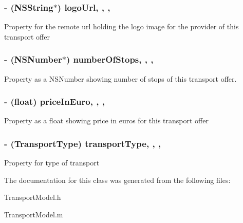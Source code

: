 \subsubsection[{\texorpdfstring{logo\+Url}{logoUrl}}]{\setlength{\rightskip}{0pt plus 5cm}-\/ (N\+S\+String$\ast$) logo\+Url\hspace{0.3cm}{\ttfamily [read]}, {\ttfamily [write]}, {\ttfamily [nonatomic]}, {\ttfamily [retain]}}\hypertarget{interface_transport_model_a2ec564526223b8cfdc249b2ee67d2740}{}\label{interface_transport_model_a2ec564526223b8cfdc249b2ee67d2740}
Property for the remote url holding the logo image for the provider of this transport offer 
\subsubsection[{\texorpdfstring{number\+Of\+Stops}{numberOfStops}}]{\setlength{\rightskip}{0pt plus 5cm}-\/ (N\+S\+Number$\ast$) number\+Of\+Stops\hspace{0.3cm}{\ttfamily [read]}, {\ttfamily [write]}, {\ttfamily [nonatomic]}, {\ttfamily [retain]}}\hypertarget{interface_transport_model_a81a3d5264f0ac295ea5ff98f85f5172a}{}\label{interface_transport_model_a81a3d5264f0ac295ea5ff98f85f5172a}
Property as a N\+S\+Number showing number of stops of this transport offer. 
\subsubsection[{\texorpdfstring{price\+In\+Euro}{priceInEuro}}]{\setlength{\rightskip}{0pt plus 5cm}-\/ (float) price\+In\+Euro\hspace{0.3cm}{\ttfamily [read]}, {\ttfamily [write]}, {\ttfamily [nonatomic]}, {\ttfamily [assign]}}\hypertarget{interface_transport_model_aa756852caf3b4c7fdc98365e3aac39e8}{}\label{interface_transport_model_aa756852caf3b4c7fdc98365e3aac39e8}
Property as a float showing price in euros for this transport offer 
\subsubsection[{\texorpdfstring{transport\+Type}{transportType}}]{\setlength{\rightskip}{0pt plus 5cm}-\/ (Transport\+Type) transport\+Type\hspace{0.3cm}{\ttfamily [read]}, {\ttfamily [write]}, {\ttfamily [nonatomic]}, {\ttfamily [assign]}}\hypertarget{interface_transport_model_a5d4580718dd9fedaf751f86219b657bd}{}\label{interface_transport_model_a5d4580718dd9fedaf751f86219b657bd}
Property for type of transport 

The documentation for this class was generated from the following files\+:\begin{DoxyCompactItemize}
\item 
Transport\+Model.\+h\item 
Transport\+Model.\+m\end{DoxyCompactItemize}

